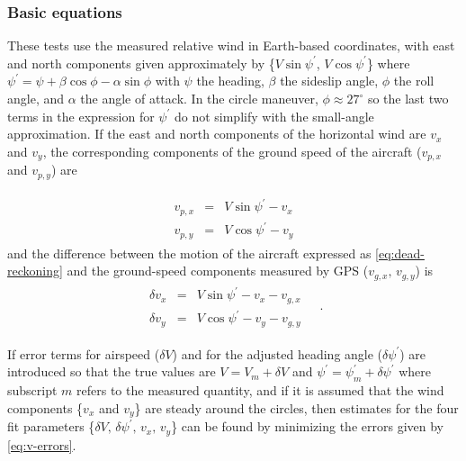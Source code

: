 \documentclass[12pt,twoside,english]{article}\usepackage[]{graphicx}\usepackage[]{color}
\begin{document}
\subsubsection{Basic equations}

These tests use the measured relative wind in Earth-based coordinates, with east and north components given approximately by \{$V\sin\psi^{\prime}$, $V\cos\psi^{\prime}$\} where $\psi^{\prime}=\psi+\beta\cos\phi-\alpha\sin\phi$ with $\psi$ the heading, $\beta$ the sideslip angle, $\phi$ the roll angle, and $\alpha$ the angle of attack. In the circle maneuver, $\phi\approx27^{\circ}$ so the last two terms in the expression for $\psi^{\prime}$ do not simplify with the small-angle approximation. If the east and north components of the horizontal wind are $v_{x}$ and $v_{y}$, the corresponding components of the ground speed of the aircraft ($v_{p,x}$ and $v_{p,y}$) are 

\begin{eqnarray}
\begin{split}
v_{p,x} & = & V\sin\psi^{\prime}-v_{x}\\ v_{p,y} & = & V\cos\psi^{\prime}-v_{y} 
\end{split}
\label{eq:dead-reckoning}
\end{eqnarray}
and the difference between the motion of the aircraft expressed as \eqref{eq:dead-reckoning} and the ground-speed components measured by GPS ($v_{g,x},\,v_{g,y}$) is\\ 
\begin{eqnarray}
\begin{split}
\delta v_{x} & = & V\sin\psi^{\prime}-v_{x}-v_{g,x}\\ 
\delta v_{y} & = & V\cos\psi^{\prime}-v_{y}-v_{g,y} 
\end{split}
~~~~~.\label{eq:v-errors} 
\end{eqnarray}

If error terms for airspeed ($\delta V$) and for the adjusted heading angle ($\delta\psi^{\prime}$) are introduced so that the true values are $V=V_{m}+\delta V$ and $\psi^{\prime}=\psi_{m}^{\prime}+\delta\psi^{\prime}$ where subscript $m$ refers to the measured quantity, and if it is assumed that the wind components \{$v_{x}$ and $v_{y}$\} are steady around the circles, then estimates for the four fit parameters \{$\delta V,\,\delta\psi^{\prime},\,v_{x},\,v_{y}$\} can be found by minimizing the errors given by \eqref{eq:v-errors}. 
\end{document}
